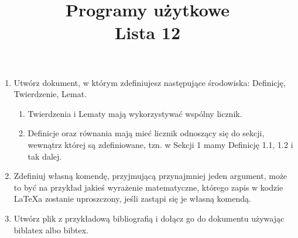 \documentclass[12pt, letterpaper]{article}
\title{Programy użytkowe \\ Lista 12}
\date{}
\begin{document}
\maketitle
\begin{enumerate}
    \item Utwórz dokument, w którym zdefiniujesz następujące środowiska: Definicję, Twierdzenie, Lemat.
    \begin{enumerate}[label=\alph*)]
        \item Twierdzenia i Lematy mają wykorzystywać wspólny licznik.
        \item Definicje oraz równania mają mieć licznik odnoszący się do sekcji, wewnątrz której są zdefiniowane, tzn. w Sekcji 1 mamy Definicję 1.1, 1.2 i tak dalej. 
    \end{enumerate}
\item Zdefiniuj własną komendę, przyjmującą przynajmniej jeden argument, może to być na przykład jakieś wyrażenie matematyczne, którego zapis w kodzie \LaTeX{a} zostanie uproszczony, jeśli zastąpi się je własną komendą.
\item Utwórz plik z przykładową bibliografią i dołącz go do dokumentu używając biblatex albo bibtex.
\end{enumerate}
\end{document}
